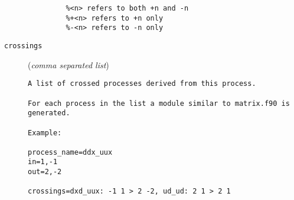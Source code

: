 \begin{description}
\begin{verbatim}
         %<n> refers to both +n and -n
         %+<n> refers to +n only
         %-<n> refers to -n only
\end{verbatim}
\item[\texttt{crossings}] (\textit{comma separated list})
\begin{verbatim}
A list of crossed processes derived from this process.

For each process in the list a module similar to matrix.f90 is
generated.

Example:

process_name=ddx_uux
in=1,-1
out=2,-2

crossings=dxd_uux: -1 1 > 2 -2, ud_ud: 2 1 > 2 1
\end{verbatim}
\end{description}

